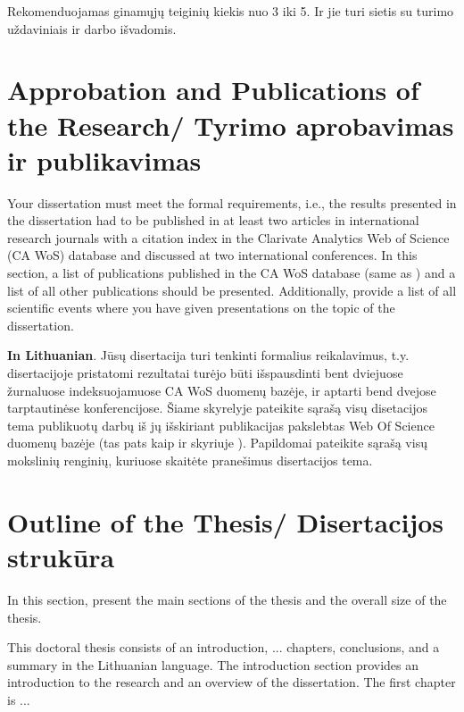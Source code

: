 Rekomenduojamas ginamųjų teiginių kiekis nuo  3 iki 5. Ir jie turi sietis su turimo uždaviniais ir darbo išvadomis.


\section*{Approbation and Publications of the Research/ Tyrimo aprobavimas ir publikavimas} %

Your dissertation must meet the formal requirements, i.e., the results presented in the dissertation had to be published in at least two articles in international research journals with a citation index in the Clarivate Analytics Web of Science (CA WoS) database and discussed at two international conferences.
In this section, a list of publications published in the CA WoS database (same as ) and a list of all other publications should be presented. Additionally, provide a list of all scientific events where you have given presentations on the topic of the dissertation.

\textbf{In Lithuanian}. 
Jūsų disertacija turi tenkinti formalius reikalavimus, t.y. disertacijoje pristatomi rezultatai turėjo būti išspausdinti bent dviejuose žurnaluose indeksuojamuose CA WoS duomenų bazėje, ir aptarti bend dvejose tarptautinėse konferencijose.
Šiame skyrelyje pateikite sąrašą visų disetacijos tema publikuotų darbų iš jų išskiriant publikacijas pakslebtas Web Of Science duomenų bazėje (tas pats kaip ir skyriuje ). Papildomai pateikite sąrašą visų mokslinių renginių, kuriuose skaitėte pranešimus disertacijos tema.


\section*{Outline of the Thesis/ Disertacijos strukūra}

In this section, present the main sections of the thesis and the overall size of the thesis.

This doctoral thesis consists of an introduction, ... chapters, conclusions, and a summary in the Lithuanian language. The introduction section provides an introduction to the research and an overview of the dissertation. The first chapter is ...

